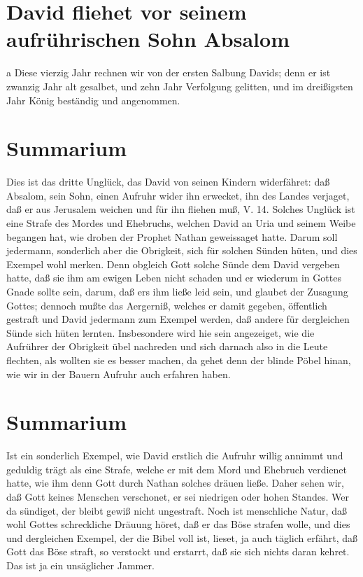 \section{David fliehet vor seinem aufrührischen Sohn Absalom}

a Diese vierzig Jahr rechnen wir von der ersten Salbung Davids; denn er ist zwanzig Jahr alt gesalbet, und zehn Jahr Verfolgung gelitten, und im dreißigsten Jahr König beständig und angenommen.

\section{Summarium}

Dies ist das dritte Unglück, das David von seinen Kindern widerfähret: daß Absalom, sein Sohn, einen Aufruhr wider ihn erwecket, ihn des Landes verjaget, daß er aus Jerusalem weichen und für ihn fliehen muß, V. 14. Solches Unglück ist eine Strafe des Mordes und Ehebruchs, welchen David an Uria und seinem Weibe begangen hat, wie droben der Prophet Nathan geweissaget hatte. Darum soll jedermann, sonderlich aber die Obrigkeit, sich für solchen Sünden hüten, und dies Exempel wohl merken. Denn obgleich Gott solche Sünde dem David vergeben hatte, daß sie ihm am ewigen Leben nicht schaden und er wiederum in Gottes Gnade sollte sein, darum, daß ers ihm ließe leid sein, und glaubet der Zusagung Gottes; dennoch mußte das Aergerniß, welches er damit gegeben, öffentlich gestraft und David jedermann zum Exempel werden, daß andere für dergleichen Sünde sich hüten lernten. Insbesondere wird hie sein angezeiget, wie die Aufrührer der Obrigkeit übel nachreden und sich darnach also in die Leute flechten, als wollten sie es besser machen, da gehet denn der blinde Pöbel hinan, wie wir in der Bauern Aufruhr auch erfahren haben.

\section{Summarium}

Ist ein sonderlich Exempel, wie David erstlich die Aufruhr willig annimmt und geduldig trägt als eine Strafe, welche er mit dem Mord und Ehebruch verdienet hatte, wie ihm denn Gott durch Nathan solches dräuen ließe. Daher sehen wir, daß Gott keines Menschen verschonet, er sei niedrigen oder hohen Standes. Wer da sündiget, der bleibt gewiß nicht ungestraft. Noch ist menschliche Natur, daß wohl Gottes schreckliche Dräuung höret, daß er das Böse strafen wolle, und dies und dergleichen Exempel, der die Bibel voll ist, lieset, ja auch täglich erfährt, daß Gott das Böse straft, so verstockt und erstarrt, daß sie sich nichts daran kehret. Das ist ja ein unsäglicher Jammer.

